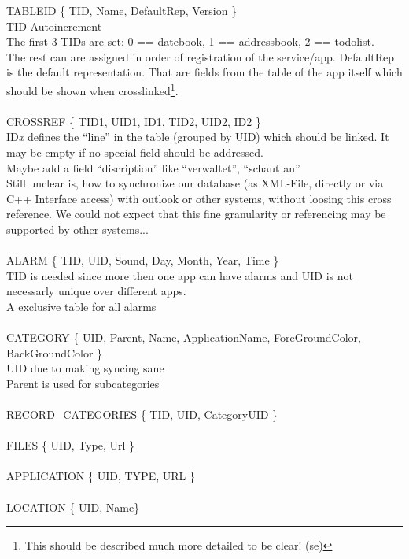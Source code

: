 TABLEID \{ TID, Name, DefaultRep, Version \}  \\
TID Autoincrement \\
The first 3 TIDs are set: 0 == datebook, 1 == addressbook, 2 == todolist.\\
The rest can are assigned in order of registration of the service/app.
DefaultRep is the default representation. That are fields from the table of the app itself which should be shown when crosslinked\footnote{This should be described much more detailed to be clear! (se)}. \\
\\
\noindent
CROSSREF \{ TID1, UID1, ID1, TID2, UID2, ID2 \}\\
ID\emph{x} defines the ``line'' in the table (grouped by UID) which should be linked. It may be empty if no special field should be addressed. \\
Maybe add a field ``discription'' like ``verwaltet'', ``schaut an''
\\
\noindent
Still unclear is, how to synchronize our database (as XML-File, directly or via C++ Interface access) with outlook or other systems, without loosing this cross reference. We could not expect that this fine granularity or referencing may be supported by other systems...\\
\\
\noindent
ALARM \{ TID, UID, Sound, Day, Month, Year, Time \}\\
TID is needed since more then one app can have alarms and UID is not necessarly unique over different apps. \\
A exclusive table for all alarms\\
\\
\noindent
CATEGORY \{ UID, Parent, Name, ApplicationName, ForeGroundColor, BackGroundColor \}\\
UID due to making syncing sane\\
Parent is used for subcategories \\
\\
\noindent
RECORD\_CATEGORIES \{ TID, UID, CategoryUID \}\\
\\
\noindent
FILES \{ UID, Type, Url \}\\ 
\\
\noindent
APPLICATION \{ UID, TYPE, URL \}\\ 
\\
\noindent
LOCATION \{ UID, Name\}\\



